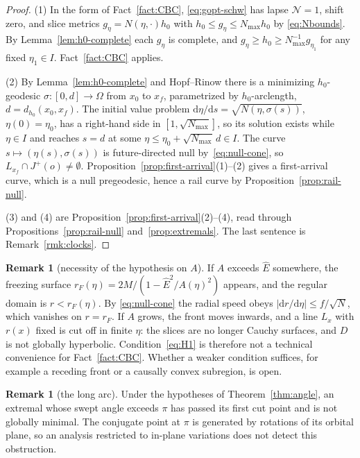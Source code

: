 \documentclass[aip,jmp,amsmath,amssymb,reprint]{revtex4-2}
\newcommand{\Ehat}{\hat E}
\newcommand{\dd}{\mathrm{d}}
\theoremstyle{plain}
\theoremstyle{definition}
\newtheorem{remark}[proposition]{Remark}
\begin{document}
\begin{proof}
(1) In the form of Fact~\ref{fact:CBC}, \eqref{eq:gopt-schw} has lapse $\mathcal N=1$, shift
zero, and slice metrics $g_\eta=N(\eta,\cdot)h_0$ with $h_0\le g_\eta\le N_{\max}h_0$ by
\eqref{eq:Nbounds}. By Lemma~\ref{lem:h0-complete} each $g_\eta$ is complete, and
$g_\eta\ge h_0\ge N_{\max}^{-1}g_{\eta_1}$ for any fixed $\eta_1\in I$.
Fact~\ref{fact:CBC} applies.

(2) By Lemma~\ref{lem:h0-complete} and Hopf--Rinow there is a minimizing $h_0$-geodesic
$\sigma:[0,d]\to\Omega$ from $x_0$ to $x_f$, parametrized by $h_0$-arclength,
$d=d_{h_0}(x_0,x_f)$. The initial value problem $\dd\eta/\dd s=\sqrt{N(\eta,\sigma(s))}$,
$\eta(0)=\eta_0$, has a right-hand side in $[1,\sqrt{N_{\max}}]$, so its solution exists
while $\eta\in I$ and reaches $s=d$ at some $\eta\le\eta_0+\sqrt{N_{\max}}\,d\in I$. The curve
$s\mapsto(\eta(s),\sigma(s))$ is future-directed null by~\eqref{eq:null-cone}, so
$L_{x_f}\cap J^+(o)\neq\emptyset$. Proposition~\ref{prop:first-arrival}(1)--(2) gives a
first-arrival curve, which is a null pregeodesic, hence a rail curve by
Proposition~\ref{prop:rail-null}.

(3) and (4) are Proposition~\ref{prop:first-arrival}(2)--(4), read through
Propositions~\ref{prop:rail-null} and~\ref{prop:extremals}. The last sentence is
Remark~\ref{rmk:clocks}.
\end{proof}

\begin{remark}[necessity of the hypothesis on $A$]\label{rmk:freezing}
If $A$ exceeds $\Ehat$ somewhere, the freezing surface
$r_F(\eta)=2M/(1-\Ehat^2/A(\eta)^2)$ appears, and the regular domain is $r<r_F(\eta)$. By
\eqref{eq:null-cone} the radial speed obeys $|\dd r/\dd\eta|\le f/\sqrt N$, which vanishes
on $r=r_F$. If $A$ grows, the front moves inwards, and a line $L_x$ with $r(x)$ fixed is
cut off in finite $\eta$: the slices are no longer Cauchy surfaces, and $D$ is not
globally hyperbolic. Condition~\eqref{eq:H1} is therefore not a technical convenience
for Fact~\ref{fact:CBC}. Whether a weaker condition suffices, for example a receding
front or a causally convex subregion, is open.
\end{remark}

\begin{remark}[the long arc]\label{rmk:long-arc}
Under the hypotheses of Theorem~\ref{thm:angle}, an extremal whose
swept angle exceeds $\pi$ has passed its first cut point and is not
globally minimal. The conjugate point at $\pi$ is generated by
rotations of its orbital plane, so an analysis restricted to
in-plane variations does not detect this obstruction.
\end{remark}
\end{document}
